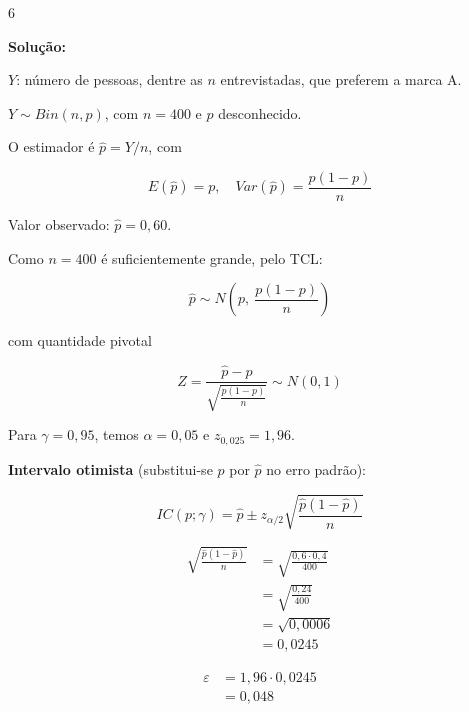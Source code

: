 \documentclass[8pt, a4paper, landscape]{extarticle}
\begin{document}
\begin{multicols}{6}
\vspace{0.3cm}

\textbf{Solução:}

$Y$: número de pessoas, dentre as $n$ entrevistadas, que preferem a marca A.

$Y \sim Bin(n, p)$, com $n = 400$ e $p$ desconhecido.

O estimador é $\hat{p} = Y/n$, com

\begin{equation*}
E(\hat{p}) = p, \quad Var(\hat{p}) = \frac{p(1-p)}{n}
\end{equation*}

Valor observado: $\hat{p} = 0,60$.

Como $n = 400$ é suficientemente grande, pelo TCL:

\begin{equation*}
\hat{p} \sim N\left(p,\ \frac{p(1-p)}{n}\right)
\end{equation*}

com quantidade pivotal

\begin{equation*}
Z = \frac{\hat{p} - p}{\sqrt{\frac{p(1-p)}{n}}} \sim N(0,1)
\end{equation*}

Para $\gamma = 0,95$, temos $\alpha = 0,05$ e $z_{0,025} = 1,96$.

\vspace{0.2cm}

\textbf{Intervalo otimista} (substitui-se $p$ por $\hat{p}$ no erro padrão):

\begin{equation*}
IC(p;\gamma) = \hat{p} \pm z_{\alpha/2}\sqrt{\frac{\hat{p}(1-\hat{p})}{n}}
\end{equation*}

\begin{equation*}
\begin{split}
\sqrt{\frac{\hat{p}(1-\hat{p})}{n}} &= \sqrt{\frac{0,6 \cdot 0,4}{400}} \\
&= \sqrt{\frac{0,24}{400}} \\
&= \sqrt{0,0006} \\
&= 0,0245
\end{split}
\end{equation*}

\begin{equation*}
\begin{split}
\varepsilon &= 1,96 \cdot 0,0245 \\
&= 0,048
\end{split}
\end{equation*}


\end{multicols}
\end{document}
